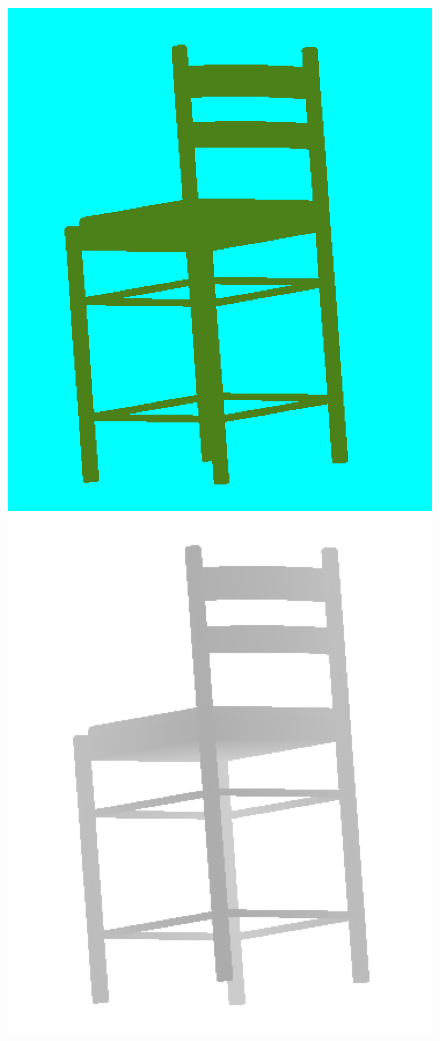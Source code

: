 \documentclass[12pt, a4paper, oneside]{article}
\begin{document}
\begin{figure}
    \begin{center}
        \includegraphics[scale=0.41]{images/chaise-3d.png}
        \includegraphics[scale=0.41]{images/chaise-depth.png}

\end{center}
\end{figure}
\end{document}
